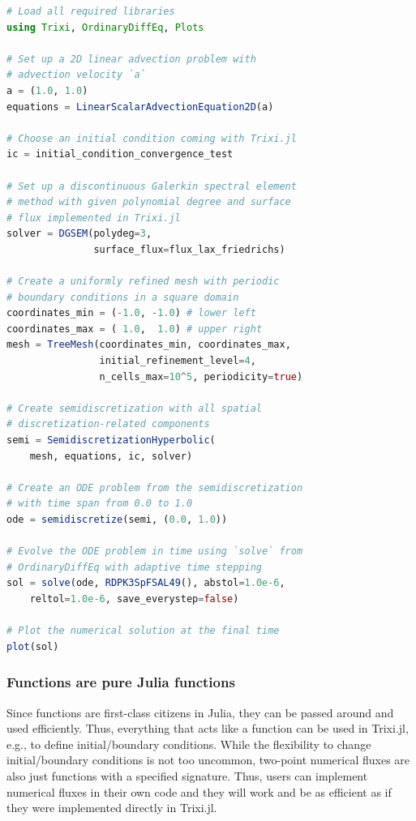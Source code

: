 \documentclass[hidelinks]{juliacon} %
\makeatletter
\newcommand{\eg}[0]{{e.g.\@}\xspace}
\newcommand{\trixi}{Trixi.jl\xspace}
\makeatother
\begin{document}
\begin{lstlisting}[language = Julia]
# Load all required libraries
using Trixi, OrdinaryDiffEq, Plots

# Set up a 2D linear advection problem with
# advection velocity `a`
a = (1.0, 1.0)
equations = LinearScalarAdvectionEquation2D(a)

# Choose an initial condition coming with Trixi.jl
ic = initial_condition_convergence_test

# Set up a discontinuous Galerkin spectral element
# method with given polynomial degree and surface
# flux implemented in Trixi.jl
solver = DGSEM(polydeg=3,
               surface_flux=flux_lax_friedrichs)

# Create a uniformly refined mesh with periodic
# boundary conditions in a square domain
coordinates_min = (-1.0, -1.0) # lower left
coordinates_max = ( 1.0,  1.0) # upper right
mesh = TreeMesh(coordinates_min, coordinates_max,
                initial_refinement_level=4,
                n_cells_max=10^5, periodicity=true)

# Create semidiscretization with all spatial
# discretization-related components
semi = SemidiscretizationHyperbolic(
    mesh, equations, ic, solver)

# Create an ODE problem from the semidiscretization
# with time span from 0.0 to 1.0
ode = semidiscretize(semi, (0.0, 1.0))

# Evolve the ODE problem in time using `solve` from
# OrdinaryDiffEq with adaptive time stepping
sol = solve(ode, RDPK3SpFSAL49(), abstol=1.0e-6,
    reltol=1.0e-6, save_everystep=false)

# Plot the numerical solution at the final time
plot(sol)
\end{lstlisting}

\subsubsection{Functions are pure Julia functions}

Since functions are first-class citizens in Julia, they can be passed around
and used efficiently. Thus, everything that acts like a function can be used
in \trixi, \eg, to define initial/boundary conditions. While the flexibility
to change initial/boundary conditions
is not too uncommon, two-point numerical fluxes are also just functions with a
specified signature. Thus, users can implement numerical fluxes in their
own code and they will work and be as efficient as if they were implemented
directly in \trixi.
\end{document}
